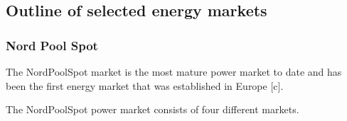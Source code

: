 
%





\subsection{Outline of selected energy markets}



\subsubsection{Nord Pool Spot}


The NordPoolSpot market is the most mature power market to date and has been the first energy market that was established in Europe [c]. 

The NordPoolSpot power market consists of four different markets. %



